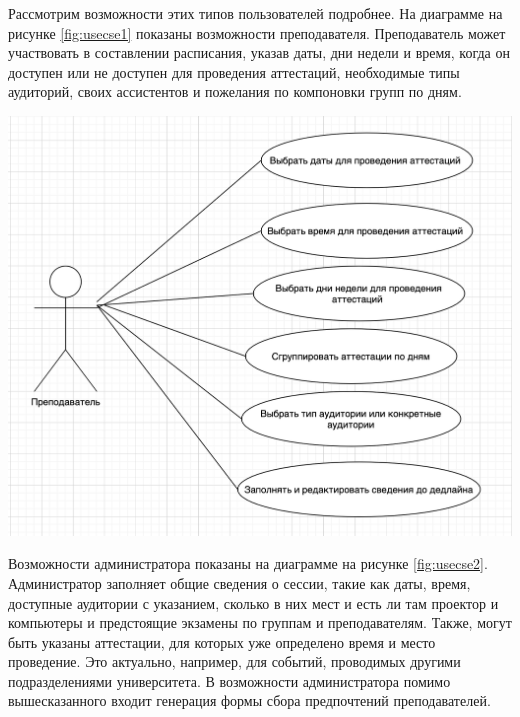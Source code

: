 Рассмотрим возможности этих типов пользователей подробнее. На диаграмме на рисунке \ref{fig:usecse1} показаны возможности преподавателя.
Преподаватель может участвовать в составлении расписания, указав даты, дни недели и время, когда он доступен или не доступен для проведения аттестаций, необходимые типы аудиторий, своих ассистентов и пожелания по компоновки групп по дням.

\begin{minipage}{\textwidth}
	\centering
	\vspace{\mfloatsep} %
	\includegraphics[scale=0.6, keepaspectratio=true] {my_folder/images/usecase1}
	\label{fig:usecse1}  
	\vspace{\mfloatsep} %
\end{minipage}

Возможности администратора показаны на диаграмме на рисунке \ref{fig:usecse2}.
Администратор заполняет общие сведения о сессии, такие как даты, время, доступные аудитории с указанием, сколько в них мест и есть ли там проектор и компьютеры и предстоящие экзамены по группам и преподавателям. Также, могут быть указаны аттестации, для которых уже определено время и место проведение. Это актуально, например, для событий, проводимых другими подразделениями университета. В возможности администратора помимо вышесказанного входит генерация формы сбора предпочтений преподавателей. 

